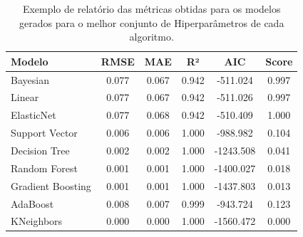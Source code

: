 \begin{table}[htbp]
	\centering
	\caption[Relatório estatístico de modelagem]{Exemplo de relatório das métricas obtidas para os modelos gerados para o melhor conjunto de Hiperparâmetros de cada algoritmo.}
	\label{tab:model_performance}
	\begin{tabular}{lccccc}
		\hline
		\textbf{Modelo} & \textbf{RMSE} & \textbf{MAE} & \textbf{R²} & \textbf{AIC} & \textbf{Score} \\
		\hline
		Bayesian & 0.077 & 0.067 & 0.942 & -511.024 & 0.997 \\
		Linear & 0.077 & 0.067 & 0.942 & -511.026 & 0.997 \\
		ElasticNet & 0.077 & 0.068 & 0.942 & -510.409 & 1.000 \\
		Support Vector & 0.006 & 0.006 & 1.000 & -988.982 & 0.104 \\
		Decision Tree & 0.002 & 0.002 & 1.000 & -1243.508 & 0.041 \\
		Random Forest & 0.001 & 0.001 & 1.000 & -1400.027 & 0.018 \\
		Gradient Boosting & 0.001 & 0.001 & 1.000 & -1437.803 & 0.013 \\
		AdaBoost & 0.008 & 0.007 & 0.999 & -943.724 & 0.123 \\
		KNeighbors & 0.000 & 0.000 & 1.000 & -1560.472 & 0.000 \\
		\hline
	\end{tabular}
\end{table}


